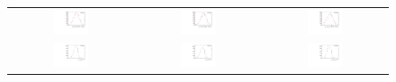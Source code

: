\begin{figure}
\begin{tabular}{ccc}
\includegraphics[width=0.3\textwidth]{ANA_resources/Plots/Monte_carlo/data_vs_MC/Kpi/log10(D0K_IPCHI2_OWNPV)_2012.pdf} & \includegraphics[width=0.3\textwidth]{ANA_resources/Plots/Monte_carlo/data_vs_MC/Kpi/log10(D0Pi_IPCHI2_OWNPV)_2012.pdf} & \includegraphics[width=0.3\textwidth]{ANA_resources/Plots/Monte_carlo/data_vs_MC/Kpi/log10(KstarPi_IPCHI2_OWNPV)_2012.pdf} \\
\includegraphics[width=0.3\textwidth]{ANA_resources/Plots/Monte_carlo/data_vs_MC/Kpi/log10(D0K_PT)_2012.pdf} & \includegraphics[width=0.3\textwidth]{ANA_resources/Plots/Monte_carlo/data_vs_MC/Kpi/log10(D0Pi_PT)_2012.pdf} & \includegraphics[width=0.3\textwidth]{ANA_resources/Plots/Monte_carlo/data_vs_MC/Kpi/log10(KstarK_PT)_2012.pdf} \\

\end{tabular}
\end{figure}
